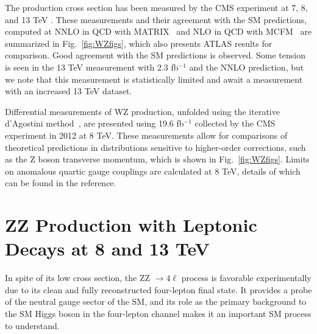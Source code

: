 \documentclass[10pt]{article}
\begin{document}
The production cross section has been measured by the CMS experiment at 7, 8, 
\cite{Khachatryan:2016poo}
and 13 TeV
\cite{Khachatryan:2016tgp}.
These measurements and their agreement with the SM
predictions, computed at NNLO in QCD with MATRIX~\cite{Grazzini:2016swo} and NLO in 
QCD with MCFM~\cite{Campbell:2011bn}
are summarized in Fig.~\ref{fig:WZfigs}, which also presents ATLAS results for comparison. 
Good agreement with the SM predictions
is observed. Some tension is seen in the 13 TeV measurement with 2.3 fb$^{-1}$
and the NNLO prediction, but we note that this measurement is statistically
limited and await a measurement with an increased 13 TeV dataset.

Differential measurements of WZ production, unfolded using the 
iterative d'Agostini method~\cite{DAgostini:1994fjx}, are presented using 19.6 fb$^{-1}$
collected by the CMS experiment in 2012 at 8 TeV. These measurements allow for
comparisons of theoretical predictions in distributions sensitive 
to higher-order corrections, such as the Z boson transverse momentum, which is
shown in Fig.~\ref{fig:WZfigs}. Limits on anomalous quartic gauge couplings are
calculated at 8 TeV, details of which can be found in the reference.


\section{ZZ Production with Leptonic Decays at 8 and 13 TeV}

In spite of its low cross section, the ZZ $\rightarrow 4\ell$ process 
is favorable experimentally due to its clean and fully reconstructed 
four-lepton final state. It provides a probe of the neutral gauge sector 
of the SM, and its role as the primary background to the SM Higgs
boson in the four-lepton channel makes it an important SM 
process to understand.
\end{document}
